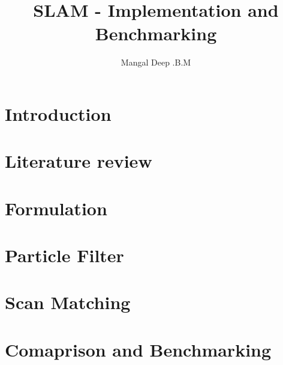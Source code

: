 \documentclass{lincolncsuthesis}
\title{SLAM - Implementation and Benchmarking}
\author{Mangal Deep .B.M}
\begin{document}
\maketitle{}








\thesisTables

\thesisBodyStart

\chapter{Introduction}


\chapter{Literature review}


\chapter{Formulation}


\chapter{Particle Filter}


\chapter{Scan Matching}


\chapter{Comaprison and Benchmarking}


\end{document}
